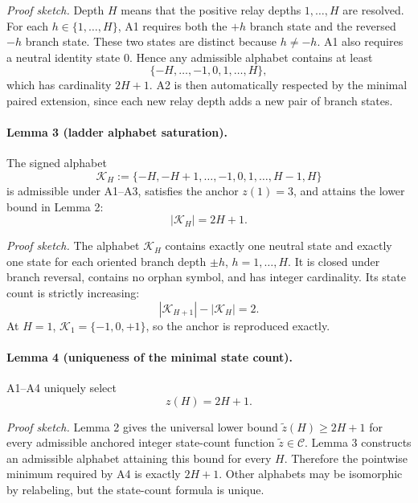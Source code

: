 \emph{Proof sketch.}
Depth \(H\) means that the positive relay depths \(1,\ldots,H\) are resolved. For each \(h\in\{1,\ldots,H\}\), A1 requires both the \(+h\) branch state and the reversed \(-h\) branch state. These two states are distinct because \(h\neq -h\). A1 also requires a neutral identity state \(0\). Hence any admissible alphabet contains at least
\begin{equation}
\{-H,\ldots,-1,0,1,\ldots,H\},
\end{equation}
which has cardinality \(2H+1\). A2 is then automatically respected by the minimal paired extension, since each new relay depth adds a new pair of branch states.

\paragraph{Lemma 3 (ladder alphabet saturation).}
The signed alphabet
\begin{equation}
\mathcal K_H:=\{-H,-H+1,\ldots,-1,0,1,\ldots,H-1,H\}
\end{equation}
is admissible under A1--A3, satisfies the anchor \(z(1)=3\), and attains the lower bound in Lemma 2:
\begin{equation}
|\mathcal K_H|=2H+1.
\end{equation}

\emph{Proof sketch.}
The alphabet \(\mathcal K_H\) contains exactly one neutral state and exactly one state for each oriented branch depth \(\pm h\), \(h=1,\ldots,H\). It is closed under branch reversal, contains no orphan symbol, and has integer cardinality. Its state count is strictly increasing:
\begin{equation}
|\mathcal K_{H+1}|-|\mathcal K_H|=2.
\end{equation}
At \(H=1\), \(\mathcal K_1=\{-1,0,+1\}\), so the anchor is reproduced exactly.

\paragraph{Lemma 4 (uniqueness of the minimal state count).}
A1--A4 uniquely select
\begin{equation}
z(H)=2H+1.
\end{equation}

\emph{Proof sketch.}
Lemma 2 gives the universal lower bound \(\widetilde z(H)\geq 2H+1\) for every admissible anchored integer state-count function \(\widetilde z\in\mathcal C\). Lemma 3 constructs an admissible alphabet attaining this bound for every \(H\). Therefore the pointwise minimum required by A4 is exactly \(2H+1\). Other alphabets may be isomorphic by relabeling, but the state-count formula is unique.

